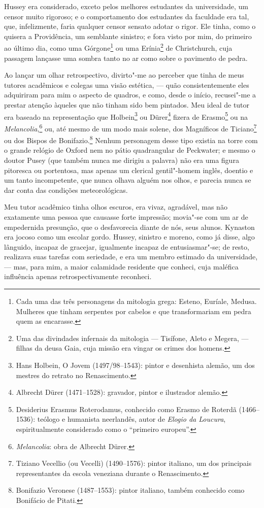 Hussey era considerado, exceto pelos melhores estudantes da
universidade, um censor muito rigoroso; e o comportamento dos estudantes
da faculdade era tal, que, infelizmente, faria qualquer censor sensato
adotar o rigor. Ele tinha, como o quisera a Providência, um semblante
sinistro; e fora visto por mim, do primeiro ao último dia, como uma
Górgone\footnote{Cada uma das três personagens da mitologia grega:
  Esteno, Euríale, Medusa. Mulheres que tinham serpentes por cabelos e
  que transformariam em pedra quem as encarasse.} ou uma
Erínia\footnote{Uma das divindades infernais da mitologia --- Tisífone,
  Aleto e Megera, --- filhas da deusa Gaia, cuja missão era vingar os
  crimes dos homens.} de Christchurch, cuja passagem
lançasse uma sombra tanto no ar como sobre o pavimento de pedra.

Ao lançar um olhar retrospectivo, divirto"-me ao perceber que tinha de
meus tutores acadêmicos e colegas uma visão estética, --- quão
consistentemente eles adquiriram para mim o aspecto de quadros, e como,
desde o início, recusei"-me a prestar atenção àqueles que não tinham sido
bem pintados. Meu ideal de tutor era baseado na representação que
Holbein\footnote{Hans Holbein, O Jovem (1497/98--1543): pintor e
  desenhista alemão, um dos mestres do retrato no Renascimento.} ou Dürer\footnote{Albrecht Dürer (1471--1528): gravador, pintor
  e ilustrador alemão.} fizera de Erasmo\footnote{Desiderius
  Erasmus Roterodamus, conhecido como Erasmo de Roterdã
  (1466--1536):
  teólogo e humanista neerlandês, autor
  de \textit{Elogio da Loucura}, espiritualmente considerado como o
  ``primeiro europeu''.} ou na
\textit{Melancolia},\footnote{\textit{Melancolia}: obra de Albrecht Dürer.} ou, até mesmo de um modo mais solene, dos Magníficos
de Ticiano\footnote{Tiziano Vecellio (ou Vecelli) (1490--1576): pintor
  italiano, um dos principais representantes da escola veneziana durante
  o Renascimento.} ou dos Bispos de Bonifazio.\footnote{Bonifazio
  Veronese (1487--1553): pintor italiano, também conhecido como Bonifácio
  de Pitati.} Nenhum personagem desse tipo existia na
torre com o grande relógio de Oxford nem no pátio quadrangular de
Peckwater; e mesmo o doutor Pusey (que também nunca me dirigiu a
palavra) não era uma figura pitoresca ou portentosa, mas apenas um
clerical gentil"-homem inglês, doentio e um tanto incompetente, que nunca
olhava alguém nos olhos, e parecia nunca se dar conta das condições
meteorológicas.

Meu tutor acadêmico tinha olhos escuros, era vivaz, agradável, mas
não exatamente uma pessoa que causasse forte impressão; movia"-se com um
ar de empedernida presunção, que o desfavorecia diante de nós, seus
alunos. Kynaston era jocoso como um escolar gordo. Hussey, sinistro e
moreno, como já disse, algo lânguido, incapaz de gracejar, igualmente
incapaz de entusiasmar"-se; de resto, realizava suas tarefas com
seriedade, e era um membro estimado da universidade, --- mas, para mim, a
maior calamidade residente que conheci, cuja maléfica influência apenas
retrospectivamente reconheci.

